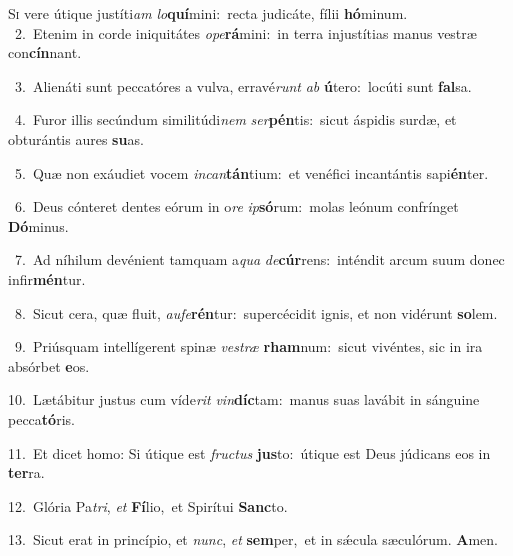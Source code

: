 \lettrine{\initial\textcolor{\initialcolor}{S}}{i} vere útique justíti\textit{am} \textit{lo}\-\textbf{quí}mini:~\star recta judicáte, fílii \textbf{hó}\-minum.\\
{\numbfont\textcolor{\numbcolor}{~2.}}~Etenim in corde iniquitátes \textit{o}\-\textit{pe}\textbf{rá}mini:~\star in terra injustítias manus vestræ con\-\textbf{cín}\-nant.\par
{\numbfont\textcolor{\numbcolor}{~3.}}~Alienáti sunt peccatóres a vulva, erravé\textit{runt} \textit{ab} \textbf{ú}\-tero:~\star locúti sunt \textbf{fal}\-sa.\par
{\numbfont\textcolor{\numbcolor}{~4.}}~Furor illis secúndum similitúdi\textit{nem} \textit{ser}\-\textbf{pén}tis:~\star sicut áspidis surdæ, et obturántis aures \textbf{su}\-as.\par
{\numbfont\textcolor{\numbcolor}{~5.}}~Quæ non exáudiet vocem \textit{in}\-\textit{can}\textbf{tán}tium:~\star et venéfici incantántis sapi\-\textbf{én}\-ter.\par
{\numbfont\textcolor{\numbcolor}{~6.}}~Deus cónteret dentes eórum in o\textit{re} \textit{ip}\-\textbf{só}rum:~\star molas leónum confrínget \textbf{Dó}\-minus.\par
{\numbfont\textcolor{\numbcolor}{~7.}}~Ad níhilum devénient tamquam a\textit{qua} \textit{de}\-\textbf{cúr}rens:~\star inténdit arcum suum donec infir\-\textbf{mén}\-tur.\par
{\numbfont\textcolor{\numbcolor}{~8.}}~Sicut cera, quæ fluit, \textit{au}\-\textit{fe}\textbf{rén}tur:~\star supercécidit ignis, et non vidérunt \textbf{so}\-lem.\par
{\numbfont\textcolor{\numbcolor}{~9.}}~Priúsquam intellígerent spinæ \textit{ves}\-\textit{træ} \textbf{rham}\-num:~\star sicut vivéntes, sic in ira absórbet \textbf{e}\-os.\par
{\numbfont\textcolor{\numbcolor}{10.}}~Lætábitur justus cum víde\textit{rit} \textit{vin}\-\textbf{díc}tam:~\star manus suas lavábit in sánguine pecca\-\textbf{tó}\-ris.\par
{\numbfont\textcolor{\numbcolor}{11.}}~Et dicet homo: Si útique est \textit{fruc}\-\textit{tus} \textbf{jus}\-to:~\star útique est Deus júdicans eos in \textbf{ter}\-ra.\par
{\numbfont\textcolor{\numbcolor}{12.}}~Glória Pa\-\textit{tri}\-, \textit{et} \textbf{Fí}\-lio,~\star et Spirítui \textbf{Sanc}\-to.\par
{\numbfont\textcolor{\numbcolor}{13.}}~Sicut erat in princípio, et \textit{nunc}\-, \textit{et} \textbf{sem}\-per,~\star et in sǽcula sæculórum. \textbf{A}\-men.\par
